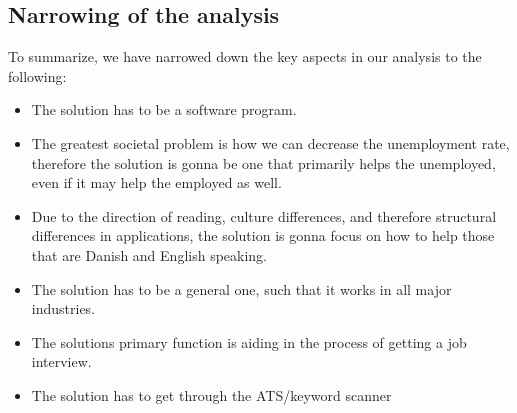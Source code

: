 \subsection{Narrowing of the analysis}
To summarize, we have narrowed down the key aspects in our analysis to the
following:
\begin{itemize}
  \item The solution has to be a software program.
  \item The greatest societal problem is how we can decrease the unemployment rate, 
  therefore the solution is gonna be one that primarily helps the unemployed, 
  even if it may help the employed as well.
  \item Due to the direction of reading, culture differences, 
  and therefore structural differences in applications, the solution is gonna focus
  on how to help those that are Danish and English speaking.
  \item The solution has to be a general one, such that it works in all major industries.
  \item The solutions primary function is aiding in the process of getting a job interview.
  \item The solution has to get through the ATS/keyword scanner
\end{itemize}
